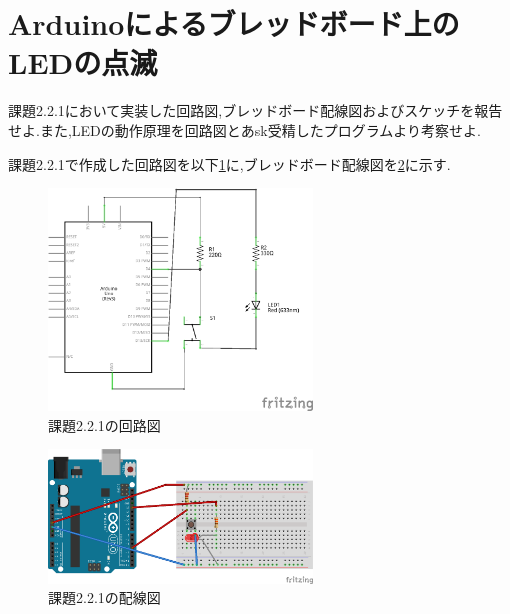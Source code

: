 \documentclass{jarticle}
\begin{document}
\section{Arduinoによるブレッドボード上のLEDの点滅}
課題2.2.1において実装した回路図,ブレッドボード配線図およびスケッチを報告せよ.また,LEDの動作原理を回路図とあsk受精したプログラムより考察せよ.

課題2.2.1で作成した回路図を以下\ref{fig:2-2-1kairo}に,ブレッドボード配線図を\ref{fig:2-2-1bread}に示す.

\begin{figure}[H]
\begin{center}
\includegraphics[width=7.0cm]{images/kadai2-2-1_kairo.png}
\caption{課題2.2.1の回路図}
\label{fig:2-2-1kairo}
\end{center}
\end{figure}


\begin{figure}[H]
\begin{center}
\includegraphics[width=7.0cm]{images/kadai2-2-1_bread.png}
\caption{課題2.2.1の配線図}
\label{fig:2-2-1bread}
\end{center}
\end{figure}
\end{document}
